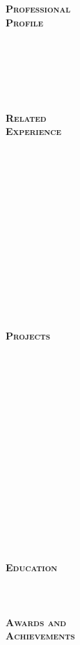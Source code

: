 \documentclass[10pt]{article}
\begin{document}
\begin{minipage}[t]{0.17\linewidth} 
	\textbf{\textsc{
	\hspace{-5pt}Professional\\Profile \\ \\ \\ \\ \\ \\ \\
	Related\\Experience \\ \\ \\ \\ \\ \\ \\ \\ \\ \\ \\ \\ \\ \\ \\
	Projects \\ \\ \\ \\ \\ \\ \\ \\ \\ \\ \\ \\ \\ \\ \\ \\ \\
	Education \\ \\ \\ \\	 
	Awards and\\ Achievements
	}}
\end{minipage}
\end{document}
